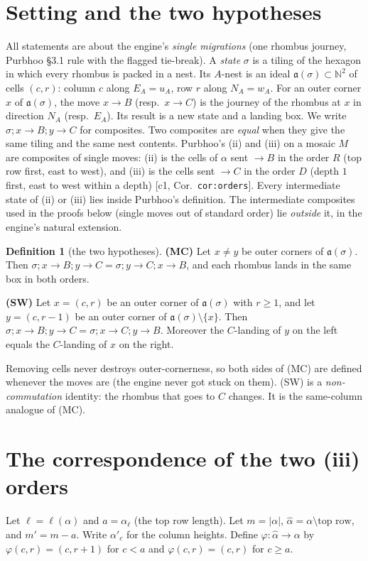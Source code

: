 \documentclass[11pt]{article}
\theoremstyle{definition}
\newtheorem{definition}[theorem]{Definition}
\newcommand{\toB}{\!\to\! B}
\newcommand{\toC}{\!\to\! C}
\newcommand{\fa}{\mathfrak a}
\begin{document}
\section{Setting and the two hypotheses}
All statements are about the engine's \emph{single migrations} (one rhombus journey, Purbhoo \S3.1 rule with the flagged
tie-break). A \emph{state} $\sigma$ is a tiling of the hexagon in which every rhombus is packed in a nest. Its $A$-nest is an
ideal $\fa(\sigma)\subset\mathbb N^2$ of cells $(c,r)$: column $c$ along $E_A=u_A$, row $r$ along $N_A=w_A$. For an outer corner
$x$ of $\fa(\sigma)$, the move $x\toB$ (resp.\ $x\toC$) is the journey of the rhombus at $x$ in direction $N_A$ (resp.\ $E_A$).
Its result is a new state and a landing box. We write $\sigma;x\toB;y\toC$ for composites. Two composites are \emph{equal}
when they give the same tiling and the same nest contents. Purbhoo's (ii) and (iii) on a mosaic $M$ are composites of
single moves: (ii) is the cells of $\alpha$ sent $\to B$ in the order $R$ (top row first, east to west), and (iii) is the cells
sent $\to C$ in the order $D$ (depth $1$ first, east to west within a depth) [c1, Cor.~\texttt{cor:orders}]. Every
intermediate state of (ii) or (iii) lies inside Purbhoo's definition. The intermediate composites used in the proofs below
(single moves out of standard order) lie \emph{outside} it, in the engine's natural extension.

\begin{definition}[the two hypotheses]
\textbf{(MC)} Let $x\ne y$ be outer corners of $\fa(\sigma)$. Then $\sigma;x\toB;y\toC=\sigma;y\toC;x\toB$, and each rhombus
lands in the same box in both orders.

\noindent\textbf{(SW)} Let $x=(c,r)$ be an outer corner of $\fa(\sigma)$ with $r\ge1$, and let $y=(c,r-1)$ be an outer corner of
$\fa(\sigma)\setminus\{x\}$. Then $\sigma;x\toB;y\toC=\sigma;x\toC;y\toB$. Moreover the $C$-landing of $y$ on the left equals the
$C$-landing of $x$ on the right.
\end{definition}

Removing cells never destroys outer-cornerness, so both sides of (MC) are defined whenever the moves are (the engine never got stuck on them).
(SW) is a \emph{non-commutation} identity: the rhombus that goes to $C$ changes. It is the same-column analogue of (MC).

\section{The correspondence of the two (iii) orders}
Let $\ell=\ell(\alpha)$ and $a=\alpha_\ell$ (the top row length). Let $m=|\alpha|$, $\hat\alpha=\alpha\setminus\text{top row}$, and $m'=m-a$. Write $\alpha'_c$ for
the column heights. Define $\varphi:\hat\alpha\to\alpha$ by $\varphi(c,r)=(c,r+1)$ for $c<a$ and $\varphi(c,r)=(c,r)$ for $c\ge a$.
\end{document}
